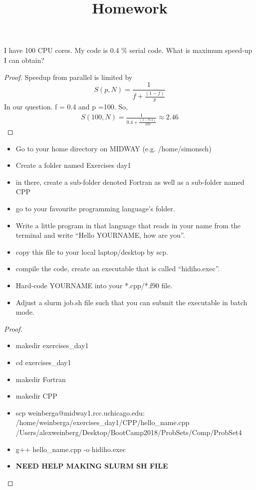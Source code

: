 \documentclass[12pt]{article}
\title{Homework}
\newenvironment{problem}[2][Problem]{\begin{trivlist}
\item[\hskip \labelsep {\bfseries #1}\hskip \labelsep {\bfseries #2.}]}{\end{trivlist}}
\begin{document}
\begin{problem}{1}
I have 100 CPU cores. My code is 0.4 \% serial code. What is maximum speed-up I can obtain?
\end{problem}
\begin{proof}
Speedup from parallel is limited by
$$
S(p,N) = \frac{1}{f + \frac{(1-f)}{p}}
$$
In our question. f = 0.4 and p =100. So,
\begin{align*}
S(100,N) = \frac{1}{0.4 + \frac{(1-0.4)}{100}} \approx 2.46
\end{align*}
\end{proof}
\begin{problem}{2}
\begin{itemize}
  \item Go to your home directory on MIDWAY (e.g. /home/simonsch)
  \item Create a folder named Exercises day1
  \item in there, create a sub-folder denoted Fortran as well as a sub-folder named CPP
  \item go to your favourite programming language's folder.
  \item Write a little program in that language that reads in your name from the terminal and write “Hello YOURNAME, how are you”.
  \item copy this file to your local laptop/desktop by scp.
  \item compile the code, create an executable that is called “hidiho.exec”.
  \item Hard-code YOURNAME into your *.cpp/*.f90 file.
  \item Adjust a slurm job.sh file such that you can submit the executable in batch mode.
\end{itemize}
\begin{proof}~\\
\begin{itemize}
\item makedir exercises\_day1
\item cd exercises\_day1
\item makedir Fortran
\item makedir CPP
\item scp weinberga@midway1.rcc.uchicago.edu: /home/weinberga/exercises\_day1/CPP/hello\_name.cpp     /Users/alexweinberg/Desktop/BootCamp2018/ProbSets/Comp/ProbSet4
\item g++ hello\_name.cpp -o hidiho.exec
\item \textbf{NEED HELP MAKING SLURM SH FILE}
\end{itemize}
\end{proof}
\end{problem}

\end{document}

